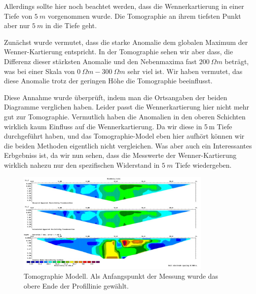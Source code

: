 Allerdings sollte hier noch beachtet werden, dass die Wennerkartierung in einer Tiefe von $\SI{5}{m}$ vorgenommen wurde. Die Tomographie an ihrem tiefsten Punkt aber nur $\SI{5}{m}$ in die Tiefe geht. 

Zunächst wurde vermutet, dass die starke Anomalie dem globalen Maximum der Wenner-Kartierung entspricht. In der Tomographie sehen wir aber dass, die Differenz dieser stärksten Anomalie und den Nebenmaxima fast $\SI{200}{\Omega m}$ beträgt, was bei einer Skala von $\SI{0}{\Omega m}- \SI{300}{\Omega m}$ sehr viel ist. Wir haben vermutet, das diese Anomalie trotz der geringen Höhe die Tomographie beeinflusst.


Diese Annahme wurde überprüft, indem man die Ortsangaben der beiden Diagramme verglichen haben. Leider passt die Wennerkartierung hier nicht mehr gut zur Tomographie. Vermutlich haben die Anomalien in den oberen Schichten wirklich kaum Einfluss auf die Wennerkartierung. Da wir diese in 5\,m Tiefe durchgeführt haben, und das Tomographie-Model eben hier aufhört können wir die beiden Methoden eigentlich nicht vergleichen. Was aber auch ein Interessantes Erbgebniss ist, da wir nun sehen, dass die Messwerte der Wenner-Kartierung wirklich nahezu nur den spezifischen Widerstand in $\SI{5}{m}$ Tiefe wiedergeben.






\begin{figure}[h]
\centering
\includegraphics[width=0.85\textwidth]{fig/Tomographie.pdf}
\caption{Tomographie Modell. Als Anfangspunkt der Messung wurde das obere Ende der Profillinie gewählt.}
\label{abb:Tomographie}
\end{figure}
  



